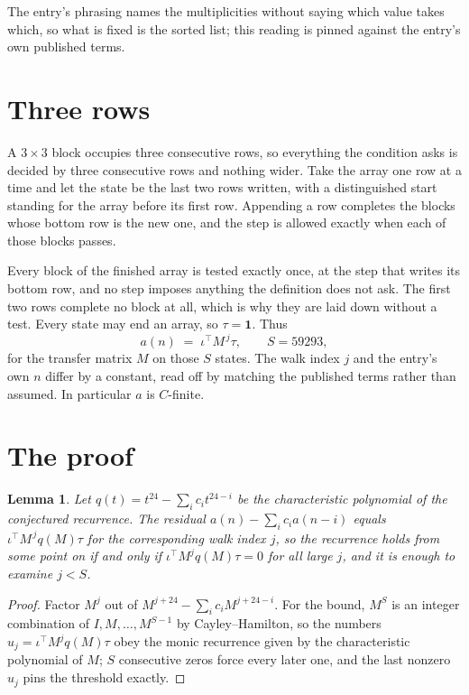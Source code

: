\documentclass[11pt,a4paper]{article}
\theoremstyle{plain}
\newtheorem{lemma}[theorem]{Lemma}
\theoremstyle{definition}
\begin{document}
The entry's phrasing names the multiplicities without saying which value takes which, so what is fixed is the sorted list; this reading is pinned against the entry's own published terms.

\section{Three rows}

A $3\times3$ block occupies three consecutive rows, so everything the condition asks is decided
by three consecutive rows and nothing wider. Take the array one row at a time and let the state
be the last two rows written, with a distinguished start standing for the array before its
first row. Appending a row completes the blocks whose bottom row is the new one, and the step
is allowed exactly when each of those blocks passes.

Every block of the finished array is tested exactly once, at the step that writes its bottom
row, and no step imposes anything the definition does not ask. The first two rows complete no
block at all, which is why they are laid down without a test. Every state may end an array, so
$\tau=\mathbf{1}$. Thus
\[
a(n)\;=\;\iota^{\!\top}M^{\,j}\tau ,\qquad S=59293,
\]
for the transfer matrix $M$ on those $S$ states. The walk index $j$ and the entry's own $n$
differ by a constant, read off by matching the published terms rather than assumed. In
particular $a$ is $C$-finite.

\section{The proof}

\begin{lemma}\label{lem:crit}
Let $q(t)=t^{24}-\sum_i c_it^{24-i}$ be the characteristic polynomial of the
conjectured recurrence. The residual $a(n)-\sum_ic_ia(n-i)$ equals
$\iota^{\!\top}M^{\,j}q(M)\tau$ for the corresponding walk index $j$, so the recurrence
holds from some point on if and only if $\iota^{\!\top}M^{j}q(M)\tau=0$ for all large $j$,
and it is enough to examine $j<S$.
\end{lemma}

\begin{proof}
Factor $M^{j}$ out of $M^{j+24}-\sum_ic_iM^{j+24-i}$. For the bound, $M^{S}$
is an integer combination of $I,M,\dots,M^{S-1}$ by Cayley--Hamilton, so the numbers
$u_j=\iota^{\!\top}M^{j}q(M)\tau$ obey the monic recurrence given by the characteristic
polynomial of $M$; $S$ consecutive zeros force every later one, and the last nonzero $u_j$
pins the threshold exactly.
\end{proof}
\end{document}
